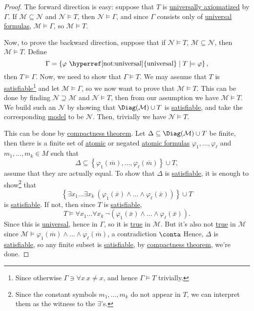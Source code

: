 \begin{proof}
	The forward direction is easy: suppose that \(T\) is \hyperref[def:universally-axiomatizable]{universally axiomatized} by \(\Gamma \). If \(\mathcal{M} \subseteq \mathcal{N} \) and \(\mathcal{N} \models T\), then \(\mathcal{N} \models \Gamma \), and since \(\Gamma \) consists only of \hyperref[not:universal]{universal} \hyperref[def:formula]{formulas}, \(\mathcal{M} \models \Gamma \), so \(\mathcal{M} \models T\).

	Now, to prove the backward direction, suppose that if \(\mathcal{N} \models T\), \(\mathcal{M} \subseteq \mathcal{N} \), then \(\mathcal{M} \models T\). Define
	\[
		\Gamma = \left\{ \varphi \text{ \hyperref[not:universal]{universal}} \mid T \models \varphi \right\},
	\]
	then \(T \models \Gamma \). Now, we need to show that \(\Gamma \models T\). We may assume that \(T\) is \hyperref[def:satisfiable]{satisfiable}\footnote{Since otherwise \(\Gamma \ni \forall x\ x \neq x\), and hence \(\Gamma \models T\) trivially.} and let \(\mathcal{M} \models \Gamma \), so we now want to prove that \(\mathcal{M} \models T\). This can be done by finding \(\mathcal{N} \supseteq \mathcal{M} \) and \(\mathcal{N} \models T\), then from our assumption we have \(\mathcal{M} \models T\). We build such an \(\mathcal{N} \) by showing that \(\Diag(\mathcal{M} ) \cup T\) is \hyperref[def:satisfiable]{satisfiable}, and take the corresponding \hyperref[def:model]{model} to be \(\mathcal{N} \). Then, trivially we have \(\mathcal{N} \models T\).

	This can be done by \hyperref[thm:compactness]{compactness theorem}. Let \(\Delta \subseteq \Diag(\mathcal{M} ) \cup T\)  be finite, then there is a finite set of \hyperref[not:atomic]{atomic} or negated \hyperref[not:atomic]{atomic formulas} \(\varphi _1, \dots , \varphi _\ell \) and \(m_1, \dots , m_k \in M\) such that
	\[
		\Delta \subseteq \left\{ \varphi _1(\overline{m} ), \dots , \varphi _\ell (\overline{m} ) \right\} \cup T,
	\]
	assume that they are actually equal. To show that \(\Delta \) is \hyperref[def:satisfiable]{satisfiable}, it is enough to show\footnote{Since the constant symbols \(m_1, \dots , m_k\) do not appear in \(T\), we can interpret them as the witness to the \(\exists \)'s.} that
	\[
		\left\{ \exists x_1 \dots \exists x_k\ (\varphi _1(\overline{x} ) \land \dots \land \varphi _\ell (\overline{x} )) \right\} \cup T
	\]
	is \hyperref[def:satisfiable]{satisfiable}. If not, then since \(T\) is \hyperref[def:satisfiable]{satisfiable},
	\[
		T\models \forall x_1 \dots \forall x_k\ \lnot (\varphi _1(\overline{x} ) \land \dots \land \varphi _\ell (\overline{x} )).
	\]
	Since this is \hyperref[not:universal]{universal}, hence in \(\Gamma \), so it is \hyperref[def:truth]{true} in \(\mathcal{M} \). But it's also not \hyperref[def:truth]{true} in \(\mathcal{M} \) since \(\mathcal{M} \models \varphi _1(\overline{m} ) \land \dots \land \varphi _\ell (\overline{m} )\), a contradiction \(\conta\) Hence, \(\Delta \) is \hyperref[def:satisfiable]{satisfiable}, so any finite subset is \hyperref[def:satisfiable]{satisfiable}, by \hyperref[thm:compactness]{compactness theorem}, we're done.
\end{proof}